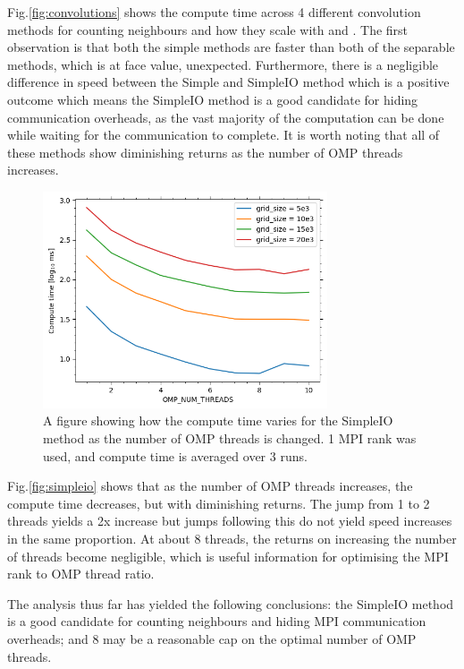     Fig.\eqref{fig:convolutions} shows the compute time across 4 different convolution methods for counting neighbours
    and how they scale with  and .
    The first observation is that both the simple methods are faster than both of the separable methods, which is
    at face value, unexpected.
    Furthermore, there is a negligible difference in speed between the Simple and SimpleIO method which is a positive
    outcome which means the SimpleIO method is a good candidate for hiding communication overheads, as the vast majority
    of the computation can be done while waiting for the communication to complete.
    It is worth noting that all of these methods show diminishing returns as the number of OMP threads increases.
    \begin{figure}[htb]
    \centering
    \includegraphics[width=0.75\textwidth]{./figures/simpleio}
    \caption{A figure showing how the compute time varies for the SimpleIO method as the number of OMP threads is changed.
    1 MPI rank was used, and compute time is averaged over 3 runs.}
    \label{fig:simpleio}
    \end{figure}

    Fig.\eqref{fig:simpleio} shows that as the number of OMP threads increases, the compute time decreases, but with
    diminishing returns.
    The jump from 1 to 2 threads yields a 2x increase but jumps following this do not yield speed increases in the same
    proportion.
    At about 8 threads, the returns on increasing the number of threads become negligible, which is useful information
    for optimising the MPI rank to OMP thread ratio.

    The analysis thus far has yielded the following conclusions: the SimpleIO method is a good candidate for counting
    neighbours and hiding MPI communication overheads; and 8 may be a reasonable cap on the optimal number of OMP threads.

